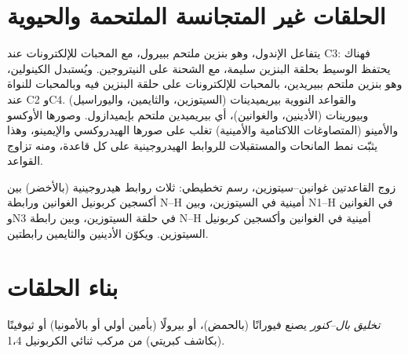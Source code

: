 \section{الحلقات غير المتجانسة الملتحمة والحيوية}

يتفاعل الإندول، وهو بنزين ملتحم ببيرول، مع المحبات للإلكترونات عند C3: فهناك
يحتفظ الوسيط بحلقة البنزين سليمة، مع الشحنة على النيتروجين.
ويُستبدل الكينولين، وهو بنزين ملتحم ببيريدين، بالمحبات للإلكترونات على
حلقة البنزين فيه وبالمحبات للنواة عند C2 وC4. والقواعد النووية
بيريميدينات (السيتوزين، والثايمين، واليوراسيل) وبيورينات (الأدينين، والغوانين)، أي
بيريميدين ملتحم بإيميدازول. وصورها الأوكسو والأمينو (المتصاوغات اللاكتامية
والأمينية) تغلب على صورها الهيدروكسي والإيمينو، وهذا يثبّت نمط
المانحات والمستقبلات للروابط الهيدروجينية على كل قاعدة، ومنه تزاوج القواعد.

\begin{omfigure}

{\small زوج القاعدتين غوانين--سيتوزين، رسم تخطيطي: ثلاث روابط هيدروجينية (بالأخضر)
بين أكسجين كربونيل الغوانين ورابطة N--H أمينية في السيتوزين، وبين N1--H في
الغوانين وN3 في حلقة السيتوزين، وبين رابطة N--H أمينية في الغوانين 
وأكسجين كربونيل السيتوزين. ويكوّن الأدينين والثايمين رابطتين.}
\end{omfigure}

\section{بناء الحلقات}

\begin{definition}\label{def:b3:heterocycles:paal-knorr}
\emph{تخليق بال--كنور} يصنع فيورانًا
(بالحمض)، أو بيرولًا (بأمين أولي أو بالأمونيا) أو ثيوفينًا (بكاشف
كبريتي) من مركب ثنائي الكربونيل 1،4.
\end{definition}

